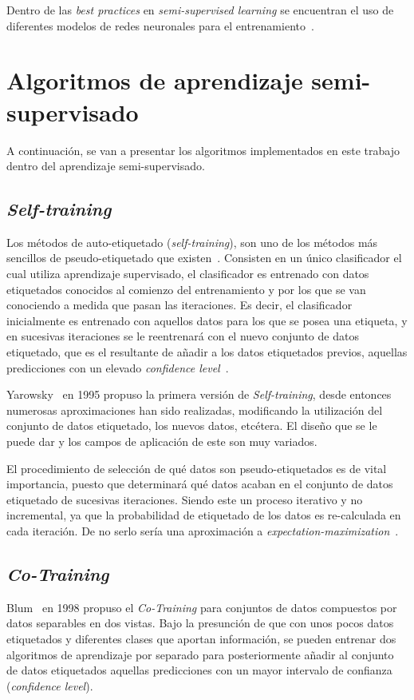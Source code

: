 Dentro de las \textit{best practices} en \textit{semi-supervised learning} se encuentran el uso de diferentes modelos de redes neuronales para el entrenamiento~\cite{thekumparampil2018attention}.


\section{Algoritmos de aprendizaje semi-supervisado}\label{sec_alg:semi-supervised}
A continuación, se van a presentar los algoritmos implementados en este trabajo dentro del aprendizaje semi-supervisado.

\subsection{\textit{Self-training}}
Los métodos de auto-etiquetado (\textit{self-training}), son uno de los métodos más sencillos de pseudo-etiquetado que existen~\cite{triguero2015self}. Consisten en un único clasificador el cual utiliza aprendizaje supervisado, el clasificador es entrenado con datos etiquetados conocidos al comienzo del entrenamiento y por los que se van conociendo a medida que pasan las iteraciones. Es decir, el clasificador inicialmente es entrenado con aquellos datos para los que se posea una etiqueta, y en sucesivas iteraciones se le reentrenará con el nuevo conjunto de datos etiquetado, que es el resultante de añadir a los datos etiquetados previos, aquellas predicciones con un elevado \textit{confidence level}~\cite{jesper2020survey}.

Yarowsky~\cite{yarowsky1995unsupervised} en 1995 propuso la primera versión de \textit{Self-training}, desde entonces numerosas aproximaciones han sido realizadas, modificando la utilización del conjunto de datos etiquetado, los nuevos datos, etcétera. El diseño que se le puede dar y los campos de aplicación de este son muy variados.

El procedimiento de selección de qué datos son pseudo-etiquetados es de vital importancia, puesto que determinará qué datos acaban en el conjunto de datos etiquetado de sucesivas iteraciones. Siendo este un proceso iterativo y no incremental, ya que la probabilidad de etiquetado de los datos es re-calculada en cada iteración. De no serlo sería una aproximación a \textit{expectation-maximization}~\cite{dempster1977maximum}.

\subsection{\textit{Co-Training}}
Blum~\cite{blum1998combining} en 1998 propuso el \textit{Co-Training} para conjuntos de datos compuestos por datos separables en dos vistas. Bajo la presunción de que con unos pocos datos etiquetados y diferentes clases que aportan información, se pueden entrenar dos algoritmos de aprendizaje por separado para posteriormente añadir al conjunto de datos etiquetados aquellas predicciones con un mayor intervalo de confianza (\textit{confidence level}).

